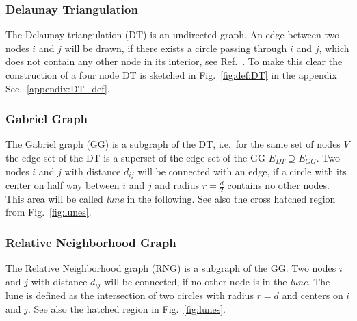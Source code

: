     \subsubsection{Delaunay Triangulation}
        The Delaunay triangulation (DT) is an undirected graph. An edge
        between two nodes \(i\) and \(j\) will be drawn, if there exists
        a circle passing through \(i\) and \(j\), which does not contain
        any other node in its interior, see Ref.\ \cite{Katajainen}.
        To make this clear the construction of a four node DT is sketched
        in Fig.\ \ref{fig:def:DT} in the appendix Sec.\ \ref{appendix:DT_def}.

    \subsubsection{Gabriel Graph}
        The Gabriel graph (GG) \cite{Gabriel1969}
        is a subgraph of the DT, i.e.\ for the same set of nodes
        \(V\) the edge set of the DT is a superset of the edge set of the
        GG \(E_{DT} \supseteq E_{GG}\). Two nodes \(i\) and \(j\) with distance
        \(d_{ij}\) will be connected with an edge, if a circle with its
        center on half way between \(i\) and \(j\) and radius
        \(r = \frac d 2\) contains no other nodes. This area will be
        called \emph{lune} in the following. See also the cross hatched region
        from Fig.\ \ref{fig:lunes}.

    \subsubsection{Relative Neighborhood Graph}
        The Relative Neighborhood
        graph (RNG) \cite{Toussaint1980} is a subgraph of the GG. Two nodes \(i\) and \(j\) with
        distance \(d_{ij}\) will be connected, if no other node is in the
        \emph{lune}. The lune is defined as the intersection of two
        circles with radius \(r = d\) and centers on \(i\) and \(j\).
        See also the hatched region in Fig.\ \ref{fig:lunes}.

